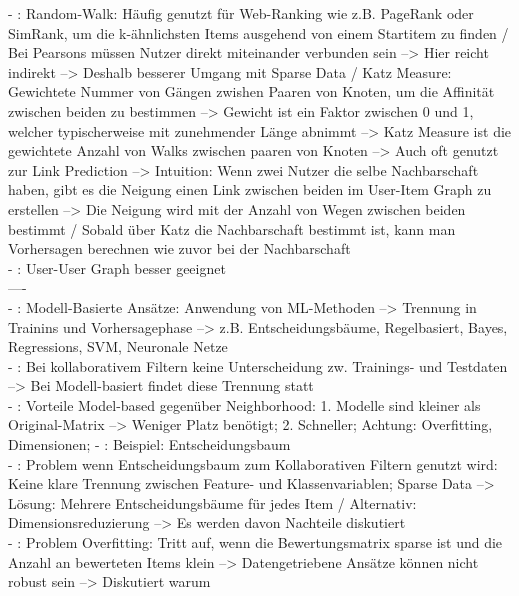- \cite[S. 61]{recommenderSystems:2016}: Random-Walk: Häufig genutzt für Web-Ranking wie z.B. PageRank oder SimRank, um die k-ähnlichsten Items ausgehend von einem Startitem zu finden / Bei Pearsons müssen Nutzer direkt miteinander verbunden sein --> Hier reicht indirekt --> Deshalb besserer Umgang mit Sparse Data / Katz Measure: Gewichtete Nummer von Gängen zwishen Paaren von Knoten, um die Affinität zwischen beiden zu bestimmen --> Gewicht ist ein Faktor zwischen 0 und 1, welcher typischerweise mit zunehmender Länge abnimmt --> Katz Measure ist die gewichtete Anzahl von Walks zwischen paaren von Knoten --> Auch oft genutzt zur Link Prediction --> Intuition: Wenn zwei Nutzer die selbe Nachbarschaft haben, gibt es die Neigung einen Link zwischen beiden im User-Item Graph zu erstellen --> Die Neigung wird mit der Anzahl von Wegen zwischen beiden bestimmt / Sobald über Katz die Nachbarschaft bestimmt ist, kann man Vorhersagen berechnen wie zuvor bei der Nachbarschaft\\
- \cite[S. 61]{recommenderSystems:2016}: User-User Graph besser geeignet\\
----\\
- \cite[S. 71]{recommenderSystems:2016}: Modell-Basierte Ansätze: Anwendung von ML-Methoden --> Trennung in Trainins und Vorhersagephase --> z.B. Entscheidungsbäume, Regelbasiert, Bayes, Regressions, SVM, Neuronale Netze\\
- \cite[S. 72]{recommenderSystems:2016}: Bei kollaborativem Filtern keine Unterscheidung zw. Trainings- und Testdaten --> Bei Modell-basiert findet diese Trennung statt\\
- \cite[S. 72]{recommenderSystems:2016}: Vorteile Model-based gegenüber Neighborhood: 1. Modelle sind kleiner als Original-Matrix --> Weniger Platz benötigt; 2. Schneller; Achtung: Overfitting, Dimensionen;
- \cite[S. 74]{recommenderSystems:2016}: Beispiel: Entscheidungsbaum\\
- \cite[S. 76]{recommenderSystems:2016}: Problem wenn Entscheidungsbaum zum Kollaborativen Filtern genutzt wird: Keine klare Trennung zwischen Feature- und Klassenvariablen; Sparse Data --> Lösung: Mehrere Entscheidungsbäume für jedes Item / Alternativ: Dimensionsreduzierung --> Es werden davon Nachteile diskutiert\\
- \cite[S. 84]{recommenderSystems:2016}: Problem Overfitting: Tritt auf, wenn die Bewertungsmatrix sparse ist und die Anzahl an bewerteten Items klein --> Datengetriebene Ansätze können nicht robust sein --> Diskutiert warum\\
